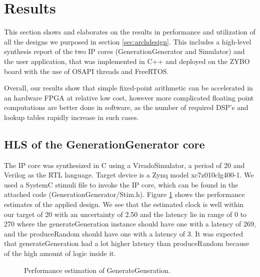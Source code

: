 \section{Results}\label{sec:results}

This section shows and elaborates on the results in performance and utilization of all the designs we purposed in section \ref{sec:archdesign}. This includes a high-level synthesis report of the two IP cores (GenerationGenerator and Simulator) and the user application, that was implemented in C++ and deployed on the ZYBO board with the use of OSAPI threads and FreeRTOS. 

Overall, our results show that simple fixed-point arithmetic can be accelerated in an hardware FPGA at relative low cost, however more complicated floating point computations are better done in software, as the number of required DSP's and lookup tables rapidly increase in such cases.

\subsection{HLS of the GenerationGenerator core}

The IP core was synthesized in C using a VivadoSimulator, a period of 20 and Verilog as the RTL language. Target device is a Zynq model xc7z010clg400-1. We used a SystemC stimuli file to invoke the IP core, which can be found in the attached code (GenerationGenerator/Stim.h). Figure \ref{fig:ggperformanceestimates} shows the performance estimates of the applied design. We see that the estimated clock is well within our target of 20 with an uncertainty of 2.50 and the latency lie in range of 0 to 270 where the generateGeneration instance should have one with a latency of 269, and the produceRandom should have one with a latency of 3. It was expected that generateGeneration had a lot higher latency than produceRandom because of the high amount of logic inside it.

\begin{figure}[h!]
	\centering
	\caption{Performance estimation of GenerateGeneration.}
	\label{fig:ggperformanceestimates}
\end{figure}

